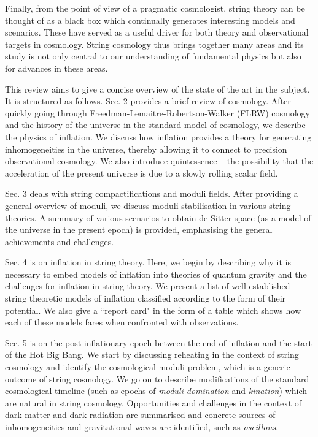  Finally, from the point of view of a pragmatic cosmologist, string theory can be thought of as a black box which continually generates interesting models and scenarios. These have served as 
 a useful driver for both theory and observational targets in cosmology.  String cosmology thus brings together many areas and its study is not only central to our understanding of fundamental physics but also for advances in these areas.
 
This review aims to give a concise overview of the state of the art in  the subject. It is structured as  follows. Sec. 2 provides a brief review of
cosmology. After quickly going through Freedman-Lemaitre-Robertson-Walker (FLRW) cosmology and the history of the universe in the standard model of cosmology, we describe the physics of inflation. We discuss how inflation provides a theory for generating inhomogeneities in the universe, thereby allowing  it to connect to precision observational cosmology. We also introduce 
quintessence -- the possibility that the acceleration of the present universe is due to a slowly rolling scalar field. 

Sec. 3 deals with string compactifications and moduli fields. After providing a general overview of moduli, we discuss moduli stabilisation in various string theories. A summary of various scenarios to obtain de Sitter space (as a model of the universe in the present epoch) is provided, emphasising the general achievements and challenges. 

Sec. 4 is on inflation in string theory.  Here, we begin by describing why it is necessary to embed models of inflation
into theories of quantum gravity and the challenges for inflation in string theory. We present a list of well-established string theoretic models of inflation classified according to the form of their potential. We also give a ``report card" in the form of a table which shows how each of these models fares when confronted with observations. 

Sec. 5 is on the post-inflationary epoch between the end of inflation and the start of the Hot Big Bang. We start by discussing reheating in the context of string cosmology and identify the cosmological moduli problem, which is a generic outcome of string cosmology. We go on to describe modifications of the standard cosmological timeline (such as epochs of {\it moduli domination} and {\it kination}) which are natural in string cosmology. Opportunities and challenges in the context of dark matter and dark radiation are summarised and concrete sources of inhomogeneities and gravitational waves are identified, such as {\it oscillons}.

